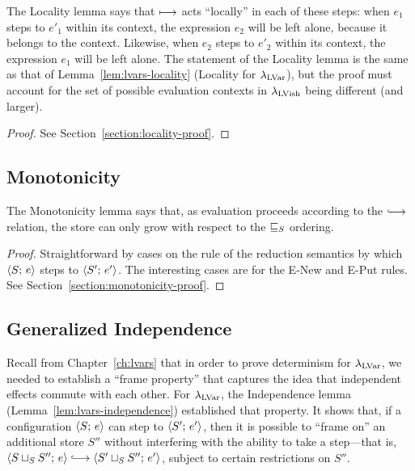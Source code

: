 The Locality lemma says that $\longmapsto$ acts ``locally'' in each of
these steps: when $e_1$ steps to $e'_1$ within its context, the
expression $e_2$ will be left alone, because it belongs to the
context.  Likewise, when $e_2$ steps to $e'_2$ within its context, the
expression $e_1$ will be left alone.  The statement of the Locality
lemma is the same as that of Lemma~\ref{lem:lvars-locality} (Locality
for $\lambda_{\textrm{LVar}}$), but the proof must account for the set of possible
evaluation contexts in $\lambda_{\textrm{LVish}}$ being different (and larger).

\LemLocality
\begin{proof}
   See
  Section~\ref{section:locality-proof}.
\end{proof}

\subsection{Monotonicity}\label{subsection:quasi-monotonicity}

The Monotonicity lemma says that, as evaluation proceeds according to
the $\parstepsto$ relation, the store can only grow with respect to
the $ \sqsubseteq_S $ ordering.

\LemMonotonicity
\begin{proof}
  Straightforward by cases on the rule of the reduction semantics by
  which $\langle S;\, e \rangle$ steps to $\langle S';\, e' \rangle$. The interesting
  cases are for the {\sc E-New} and {\sc E-Put} rules.  See
  Section~\ref{section:monotonicity-proof}.
\end{proof}

\subsection{Generalized Independence}\label{subsection:quasi-generalized-independence}

Recall from Chapter~\ref{ch:lvars} that in order to prove determinism
for $\lambda_{\textrm{LVar}}$, we needed to establish a ``frame property'' that
captures the idea that independent effects commute with each other.
For $\lambda_{\textrm{LVar}}$, the Independence lemma
(Lemma~\ref{lem:lvars-independence}) established that property.  It
shows that, if a configuration $\langle S;\, e \rangle$ can step to
$\langle S';\, e' \rangle$, then it is possible to ``frame on'' an additional
store $S''$ without interfering with the ability to take a step---that
is, $\config{\lubstore{S}{S''}}{e} \parstepsto
\config{\lubstore{S'}{S''}}{e'}$, subject to certain restrictions on
$S''$.

